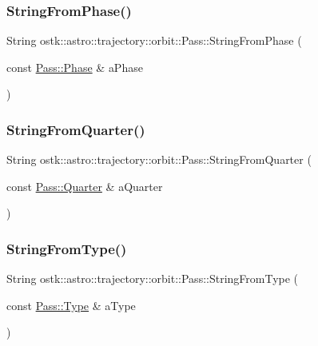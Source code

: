 \subsubsection{\texorpdfstring{String\+From\+Phase()}{StringFromPhase()}}
{\footnotesize\ttfamily String ostk\+::astro\+::trajectory\+::orbit\+::\+Pass\+::\+String\+From\+Phase (\begin{DoxyParamCaption}\item[{const \hyperlink{classostk_1_1astro_1_1trajectory_1_1orbit_1_1_pass_a9fb48e13f29c899a8b74c43091fe4203}{Pass\+::\+Phase} \&}]{a\+Phase }\end{DoxyParamCaption})\hspace{0.3cm}{\ttfamily [static]}}

\mbox{\label{classostk_1_1astro_1_1trajectory_1_1orbit_1_1_pass_a6de5cf26676f3375ed5ebe16c3d963c1}} 
\subsubsection{\texorpdfstring{String\+From\+Quarter()}{StringFromQuarter()}}
{\footnotesize\ttfamily String ostk\+::astro\+::trajectory\+::orbit\+::\+Pass\+::\+String\+From\+Quarter (\begin{DoxyParamCaption}\item[{const \hyperlink{classostk_1_1astro_1_1trajectory_1_1orbit_1_1_pass_a4c5f54feec066a636b1e7293aacf0114}{Pass\+::\+Quarter} \&}]{a\+Quarter }\end{DoxyParamCaption})\hspace{0.3cm}{\ttfamily [static]}}

\mbox{\label{classostk_1_1astro_1_1trajectory_1_1orbit_1_1_pass_ae3ba229e53fe1041c96a44c1609d3d28}} 
\subsubsection{\texorpdfstring{String\+From\+Type()}{StringFromType()}}
{\footnotesize\ttfamily String ostk\+::astro\+::trajectory\+::orbit\+::\+Pass\+::\+String\+From\+Type (\begin{DoxyParamCaption}\item[{const \hyperlink{classostk_1_1astro_1_1trajectory_1_1orbit_1_1_pass_a74449dbd104c6a24462b373cc55febcc}{Pass\+::\+Type} \&}]{a\+Type }\end{DoxyParamCaption})\hspace{0.3cm}{\ttfamily [static]}}

